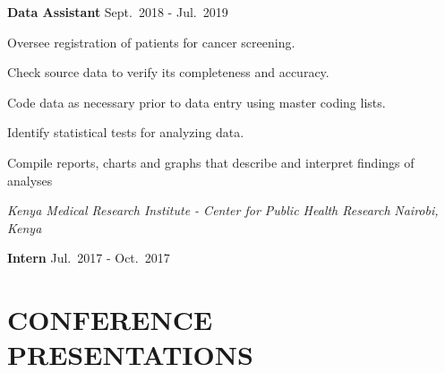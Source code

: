 \documentclass[12.5pt,]{article}
\providecommand{\tightlist}{%
  \setlength{\itemsep}{0pt}\setlength{\parskip}{0pt}}
\renewenvironment{itemize}{
  \begin{list}{}{
    \setlength{\leftmargin}{1.5em}
  }
}{
  \end{list}
}
\begin{document}
\textbf{Data Assistant} \hfill Sept.~2018 - Jul.~2019

\begin{itemize}
\tightlist
\item
  Oversee registration of patients for cancer screening.
\item
  Check source data to verify its completeness and accuracy.
\item
  Code data as necessary prior to data entry using master coding lists.
\item
  Identify statistical tests for analyzing data.
\item
  Compile reports, charts and graphs that describe and interpret
  findings of analyses
\end{itemize}

\emph{Kenya Medical Research Institute - Center for Public Health
Research} \hfill \emph{Nairobi, Kenya}

\textbf{Intern} \hfill Jul.~2017 - Oct.~2017

\hypertarget{conference-presentations}{%
\section{\texorpdfstring{\textbf{CONFERENCE
PRESENTATIONS}}{CONFERENCE PRESENTATIONS}}\label{conference-presentations}}
\end{document}
